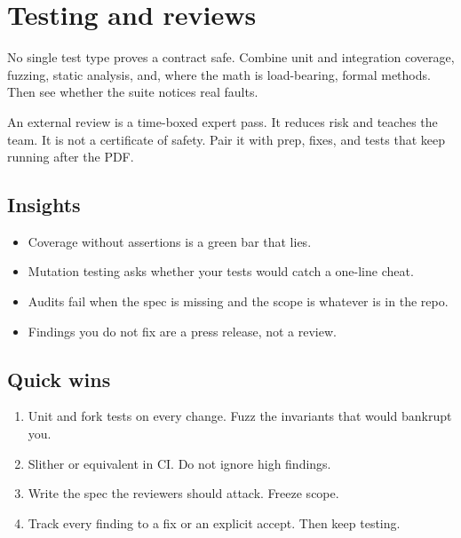 \chapter{Testing and reviews}

No single test type proves a contract safe. Combine
unit and integration coverage, fuzzing, static analysis,
and, where the math is load-bearing, formal methods.
Then see whether the suite notices real faults.

An external review is a time-boxed expert pass. It
reduces risk and teaches the team. It is not a
certificate of safety. Pair it with prep, fixes, and
tests that keep running after the PDF.

\section{Insights}

\begin{itemize}
  \item Coverage without assertions is a green bar that
  lies.
  \item Mutation testing asks whether your tests would
  catch a one-line cheat.
  \item Audits fail when the spec is missing and the
  scope is whatever is in the repo.
  \item Findings you do not fix are a press release, not
  a review.
\end{itemize}

\section{Quick wins}

\begin{enumerate}
  \item Unit and fork tests on every change. Fuzz the
  invariants that would bankrupt you.
  \item Slither or equivalent in CI. Do not ignore high
  findings.
  \item Write the spec the reviewers should attack.
  Freeze scope.
  \item Track every finding to a fix or an explicit
  accept. Then keep testing.
\end{enumerate}
